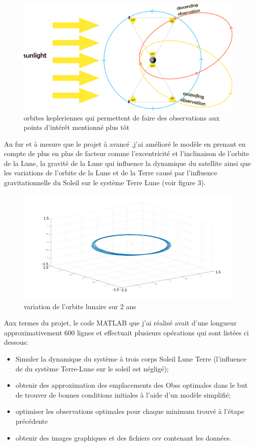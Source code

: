 \documentclass[11pt]{article} %
\begin{document}
		\begin{figure}[h]
			\includegraphics[width=18cm]{images/observations_main.png}
			\caption{orbites kepleriennes qui permettent de faire des observations aux points d'intérêt mentionné plus tôt}
		\end{figure}
		Au fur et à mesure que le projet à avancé ,j'ai amélioré le modèle en prenant en compte de plus en plus de facteur comme l'excentricité et l'inclinaison de l'orbite de la Lune, la gravité de la Lune qui influence la dynamique du satellite ainsi que les variations de l'orbite de la Lune et de la Terre causé par l'influence gravitationnelle du Soleil sur le système Terre Lune (voir figure 3).
		\begin{figure}[h]
			\includegraphics[width=1\textwidth]{images/moon_orbit.jpg}
			\caption{variation de l'orbite lunaire sur 2 ans}
		\end{figure}
		
		Aux termes du projet, le code MATLAB que j'ai réalisé avait d'une longueur approximativement 600 lignes et effectuait plusieurs opérations qui sont listées ci dessous: 
		
		\begin{itemize}
			\item Simuler la dynamique du système à trois corps Soleil Lune Terre (l'influence de du système Terre-Lune sur le soleil est négligé);
			\item obtenir des approximation des emplacements des \glspl{Obs} optimales dans le but de trouver de bonnes conditions initiales à l'aide d'un modèle simplifié;
			\item optimiser les observations optimales pour chaque minimum trouvé à l'étape précédente
			\item obtenir des images graphiques et des fichiers csv contenant les données.
		\end{itemize}
		
\end{document}
